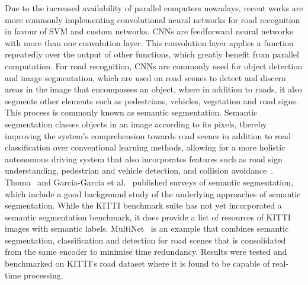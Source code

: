 
Due to the increased availability of parallel computers nowadays, recent works are more commonly implementing convolutional neural networks for road recognition in favour of SVM and custom networks. CNNs are feedforward neural networks with more than one convolution layer. This convolution layer applies a function repeatedly over the output of other functions, which greatly benefit from parallel computation. For road recognition, CNNs are commonly used for object detection and image segmentation, which are used on road scenes to detect and discern areas in the image that encompasses an object, where in addition to roads, it also segments other elements such as pedestrians, vehicles, vegetation and road signs. This process is commonly known as semantic segmentation. Semantic segmentation classes objects in an image according to its pixels, thereby improving the system's comprehension towards road scenes in addition to road classification over conventional learning methods, allowing for a more holistic autonomous driving system that also incorporates features such as road sign understanding, pedestrian and vehicle detection, and collision avoidance~\cite{d._kochanov_scene_2016,teichmann_multinet:_2016,badrinarayanan_segnet:_2017}. Thoma~\cite{thoma_survey_2016} and Garcia-Garcia et al.~\cite{garcia-garcia_review_2017} published surveys of semantic segmentation, which include a good background study of the underlying approaches of semantic segmentation. While the KITTI benchmark suite has not yet incorporated a semantic segmentation benchmark, it does provide a list of resources of KITTI images with semantic labels. MultiNet~\cite{teichmann_multinet:_2016} is an example that combines semantic segmentation, classification and detection for road scenes that is consolidated from the same encoder to minimise time redundancy. Results were tested and benchmarked on KITTI's road dataset where it is found to be capable of real-time processing. 

